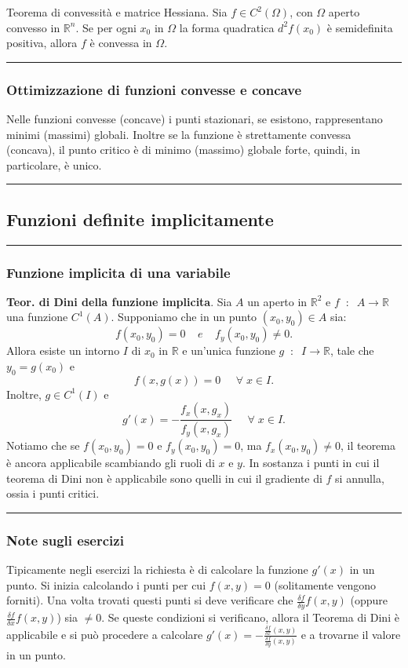 Teorema di convessità e matrice Hessiana. Sia $f \in C^2(\Omega)$, con $\Omega$ aperto convesso in $\mathbb{R}^n$. Se per ogni $x_0$ in $\Omega$ la forma quadratica $d^2f(x_0)$ è semidefinita positiva, allora $f$ è convessa in $\Omega$. \newline
\rule{\textwidth}{0.4pt}
\subsubsection*{Ottimizzazione di funzioni convesse e concave}
Nelle funzioni convesse (concave) i punti stazionari, se esistono, rappresentano minimi (massimi) globali. Inoltre se la funzione è strettamente convessa (concava), il punto critico è di minimo (massimo) globale forte, quindi, in particolare, è unico. \newline
\rule{\textwidth}{2pt}
\subsection*{Funzioni definite implicitamente}
\rule{\textwidth}{0.4pt}
\subsubsection*{Funzione implicita di una variabile}
\textbf{Teor. di Dini della funzione implicita}. Sia $A$ un aperto in $\mathbb{R}^2$ e $f \;\;:\;\; A \rightarrow \mathbb{R}$ una funzione $C^1(A)$. Supponiamo che in un punto $(x_0,y_0) \in A$ sia:
\[
    f(x_0,y_0)= 0 \;\;\;\; e \;\;\;\; f_y(x_0,y_0) \neq 0.
\] 
Allora esiste un intorno $I$ di $x_0$ in $\mathbb{R}$ e un'unica funzione $g \;\;:\;\; I \rightarrow \mathbb{R}$, tale che $y_0=g(x_0)$ e
\[
    f(x,g(x)) = 0 \;\;\;\; \;\forall\;x \in I.
\]
Inoltre, $g \in C^1(I)$ e 
\[
    g'(x) = - \frac{f_x(x,g_x)}{f_y(x,g_x)} \;\;\;\; \;\forall\;x \in I.
\]
Notiamo che se $f(x_0,y_0) = 0$ e $f_y(x_0, y_0) = 0$, ma $f_x(x_0, y_0) \neq 0$, il teorema è ancora applicabile scambiando gli ruoli di $x$ e $y$.\newline
In sostanza i punti in cui il teorema di Dini non è applicabile sono quelli in cui il gradiente di $f$ si annulla, ossia i punti critici. \newline
\rule{\textwidth}{0.4pt}
\subsubsection*{Note sugli esercizi}
Tipicamente negli esercizi la richiesta è di calcolare la funzione $g'(x)$ in un punto. Si inizia calcolando i punti per cui $f(x,y) = 0$ (solitamente vengono forniti). Una volta trovati questi punti si deve verificare che $\frac{\delta f}{\delta y} f(x,y)$ (oppure $\frac{\delta f}{\delta x} f(x,y)$) sia $\neq 0$. Se queste condizioni si verificano, allora il Teorema di Dini è applicabile e si può procedere a calcolare $g'(x) = - \frac{\frac{\delta f}{\delta x}(x,y)}{\frac{\delta f}{\delta y} (x,y)}$ e a trovarne il valore in un punto.\newline

